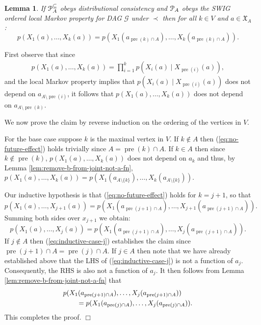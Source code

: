 \documentclass[11pt]{article}
\DeclareMathOperator{\pre}{pre}
\newtheorem{lemma}[theorem]{Lemma}
\newcommand{\G}{{\mathscr G}}
\begin{document}
{\begin{lemma}\label{lem:margin-indep-future-fixed}
 If ${\cal P}^{\subseteq}_A$ obeys distributional consistency and ${\cal P}_A$  obeys the 
SWIG ordered local Markov property for DAG $\G$ under $\prec$ then for all $k \in V$ and $a\in {\mathfrak{X}}_A$:
\begin{equation}\label{eq:no-future-effect}
p(X_1(a),\ldots ,X_k(a)) = p(X_1(a_{\pre(k)\cap A}),\ldots ,X_k(a_{\pre(k)\cap A})).
\end{equation}
\end{lemma}

  First observe that 
since
\begin{align*}
p(X_1(a),\ldots ,X_k(a)) = \prod_{i=1}^k p(X_i({ a}) \mid X_{\pre(i)}({ a}) ),
\end{align*}
and the local Markov property implies that $p(X_i({ a}) \mid X_{\pre(i)}({ a}) )$ does not depend on $a_{A\setminus \pre(i)}$, 
it follows that $p(X_1(a),\ldots ,X_k(a))$ does not depend on $a_{A\setminus \pre(k)}$.

We now prove the claim by reverse induction on the ordering of the vertices in $V$.\par
For the base case suppose $k$ is the maximal vertex in $V$. If $k\notin A$ then (\ref{eq:no-future-effect}) holds trivially
since $A = \pre(k)\cap A$.
If $k\in A$ then since $k\notin \pre(k)$, $p(X_1(a),\ldots ,X_k(a))$ does not depend on $a_k$ and thus, by 
Lemma \ref{lem:remove-b-from-joint-not-a-fn}, $p(X_1(a),\ldots ,X_k(a))=p(X_1(a_{A\setminus\{k\}}),\ldots ,X_k(a_{A\setminus\{k\}}))$.\par
Our inductive hypothesis is that (\ref{eq:no-future-effect}) holds for $k=j+1$, so that  
\begin{equation*}
p(X_1(a),\ldots ,X_{j+1}(a)) = p(X_1(a_{\pre(j+1)\cap A}),\ldots ,X_{j+1}(a_{\pre(j+1)\cap A})).
\end{equation*}
Summing both sides over $x_{j+1}$ we obtain:
\begin{equation}\label{eq:inductive-case-j}
p(X_1(a),\ldots ,X_{j}(a)) = p(X_1(a_{\pre(j+1)\cap A}),\ldots ,X_{j}(a_{\pre(j+1)\cap A})).
\end{equation}
If $j \notin A$ then (\ref{eq:inductive-case-j}) establishes the claim since $\pre(j+1)\cap A = \pre(j)\cap A$. If $j \in A$ then note that we have already established above that the LHS of (\ref{eq:inductive-case-j})
is not a function of $a_j$. Consequently, the RHS is also not a function of $a_j$. It then follows from Lemma \ref{lem:remove-b-from-joint-not-a-fn} that
\begin{align*}
\MoveEqLeft{p(X_1(a_{\pre(j+1)\cap A}),\ldots ,X_{j}(a_{\pre(j+1)\cap A}))}\\
&= p(X_1(a_{\pre(j)\cap A}),\ldots ,X_{j}(a_{\pre(j)\cap A})).
\end{align*}
This completes the proof. \hfill$\Box$\par
\bigskip

}
\end{document}
